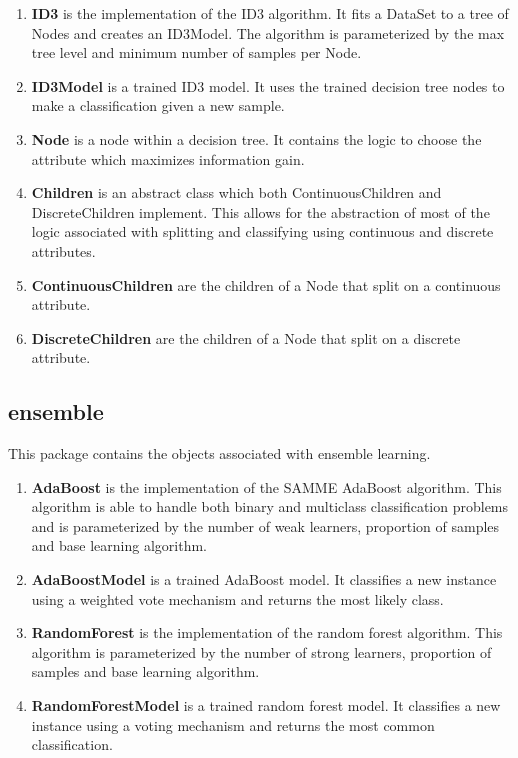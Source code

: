 \documentclass[11pt,titlepage]{article}
\newcommand{\bb}{\textbf}
\begin{document}
\begin{enumerate}[leftmargin=*]
  \item[] \bb{ID3} is the implementation of the ID3 algorithm. It fits a DataSet to a tree of Nodes and creates an ID3Model. The algorithm is parameterized by the max tree level and minimum number of samples per Node.
  \item[] \bb{ID3Model} is a trained ID3 model. It uses the trained decision tree nodes to make a classification given a new sample.
  \item[] \bb{Node} is a node within a decision tree. It contains the logic to choose the attribute which maximizes information gain.
  \item[] \bb{Children} is an abstract class which both ContinuousChildren and DiscreteChildren implement. This allows for the abstraction of most of the logic associated with splitting and classifying using continuous and discrete attributes.
  \item[] \bb{ContinuousChildren} are the children of a Node that split on a continuous attribute.
  \item[] \bb{DiscreteChildren} are the children of a Node that split on a discrete attribute.
\end{enumerate}

\subsection{ensemble}
This package contains the objects associated with ensemble learning.

\begin{enumerate}[leftmargin=*]
  \item[] \bb{AdaBoost} is the implementation of the SAMME AdaBoost algorithm. This algorithm is able to handle both binary and multiclass classification problems and is parameterized by the number of weak learners, proportion of samples and base learning algorithm.
  \item[] \bb{AdaBoostModel} is a trained AdaBoost model. It classifies a new instance using a weighted vote mechanism and returns the most likely class.
  \item[] \bb{RandomForest} is the implementation of the random forest algorithm. This algorithm is parameterized by the number of strong learners, proportion of samples and base learning algorithm.
  \item[] \bb{RandomForestModel} is a trained random forest model. It classifies a new instance using a voting mechanism and returns the most common classification.
\end{enumerate}
\end{document}
